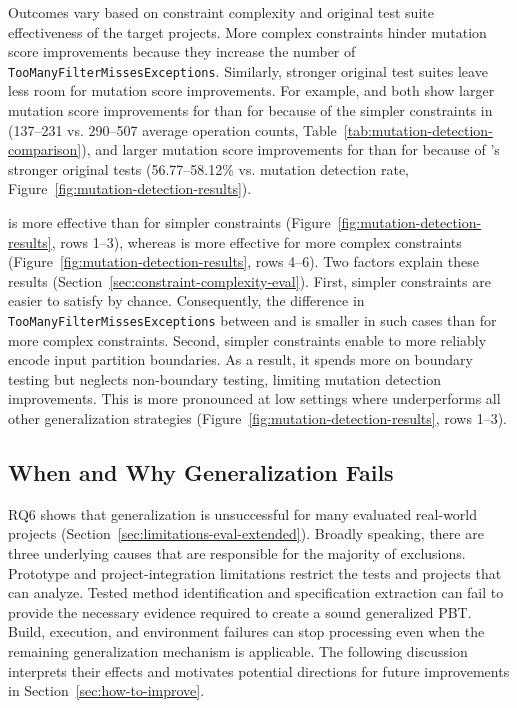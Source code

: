 Outcomes vary based on constraint complexity and
original test suite effectiveness of the target projects.
More complex constraints hinder mutation score improvements
because they increase the number of \texttt{Too\-Many\-Filter\-Misses\-Exceptions}.
Similarly, stronger original test suites leave less room for mutation score improvements.
For example, \VariantNaive{} and \VariantImproved{}
both show larger mutation score improvements
for \DatasetsEqBenchEs{} than for \DatasetsCommonsEs{}
because of the simpler constraints in \DatasetsEqBenchEs{}
(137--231 vs. 290--507 average operation counts, Table~\ref{tab:mutation-detection-comparison}),
and larger mutation score improvements for \DatasetsCommonsEs{} than for \DatasetCommonsDev{}
because of \DatasetCommonsDev{}'s stronger original tests
(56.77--58.12\% vs. \TzEffectivenessCommonsDeveloperBaselineMutationScorePct{}
\VariantInitial{} mutation detection rate, Figure~\ref{fig:mutation-detection-results}).

\VariantNaive{} is more effective than \VariantImproved{} for simpler constraints
(Figure~\ref{fig:mutation-detection-results}, rows 1--3),
whereas \VariantImproved{} is more effective for more complex constraints
(Figure~\ref{fig:mutation-detection-results}, rows 4--6).
Two factors explain these results (Section~\ref{sec:constraint-complexity-eval}).
First, simpler constraints are easier to satisfy by chance.
Consequently, the difference in \texttt{Too\-Many\-Filter\-Misses\-Exceptions}
between \VariantNaive{} and \VariantImproved{} is smaller in such cases
than for more complex constraints.
Second, simpler constraints enable \VariantImproved{}
to more reliably encode input partition boundaries.
As a result, it spends more \tries{} on boundary testing
but neglects non-boundary testing,
limiting mutation detection improvements.
This is more pronounced at low \tries{} settings
where \VariantImprovedA{} underperforms
all other generalization strategies
(Figure~\ref{fig:mutation-detection-results}, rows 1--3).

\subsection{When and Why Generalization Fails}%
\label{sec:when-it-fails}

RQ6 shows that generalization is unsuccessful for many evaluated real-world projects
(Section~\ref{sec:limitations-eval-extended}).
Broadly speaking, there are three underlying causes that are responsible for the majority of exclusions.
Prototype and project-integration limitations restrict the tests and projects that
\ToolTeralizer{} can analyze.
Tested method identification and specification extraction
can fail to provide the necessary evidence
required to create a sound generalized PBT\@.
Build, execution, and environment failures can stop processing
even when the remaining generalization mechanism is applicable.
The following discussion interprets their effects
and motivates potential directions for future improvements
in Section~\ref{sec:how-to-improve}.

